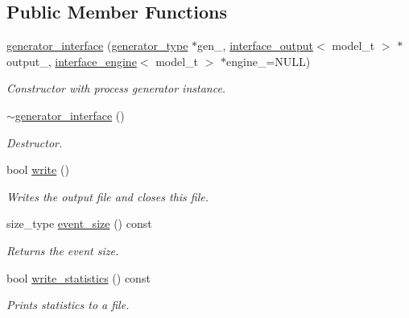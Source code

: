 \subsection*{Public Member Functions}
\begin{DoxyCompactItemize}
\item 
\hypertarget{a00238_a609d58826791fea44f886178585b6a99}{\hyperlink{a00238_a609d58826791fea44f886178585b6a99}{generator\-\_\-interface} (\hyperlink{a00442}{generator\-\_\-type} $\ast$gen\-\_\-, \hyperlink{a00315}{interface\-\_\-output}$<$ model\-\_\-t $>$ $\ast$output\-\_\-, \hyperlink{a00314}{interface\-\_\-engine}$<$ model\-\_\-t $>$ $\ast$engine\-\_\-=N\-U\-L\-L)}\label{a00238_a609d58826791fea44f886178585b6a99}

\begin{DoxyCompactList}\small\item\em Constructor with process generator instance. \end{DoxyCompactList}\item 
\hypertarget{a00238_a3c7777968ed5f4f30717315dd56cf610}{\hyperlink{a00238_a3c7777968ed5f4f30717315dd56cf610}{$\sim$generator\-\_\-interface} ()}\label{a00238_a3c7777968ed5f4f30717315dd56cf610}

\begin{DoxyCompactList}\small\item\em Destructor. \end{DoxyCompactList}\item 
bool \hyperlink{a00238_a40aafb684235b700365890c5b1bcc5dd}{write} ()
\begin{DoxyCompactList}\small\item\em Writes the output file and closes this file. \end{DoxyCompactList}\item 
\hypertarget{a00238_a629de27e2745d097f856d15b700a8754}{size\-\_\-type \hyperlink{a00238_a629de27e2745d097f856d15b700a8754}{event\-\_\-size} () const }\label{a00238_a629de27e2745d097f856d15b700a8754}

\begin{DoxyCompactList}\small\item\em Returns the event size. \end{DoxyCompactList}\item 
\hypertarget{a00238_af2d400f6139e9ee11a101c7309b60011}{bool \hyperlink{a00238_af2d400f6139e9ee11a101c7309b60011}{write\-\_\-statistics} () const }\label{a00238_af2d400f6139e9ee11a101c7309b60011}

\begin{DoxyCompactList}\small\item\em Prints statistics to a file. \end{DoxyCompactList}\end{DoxyCompactItemize}
